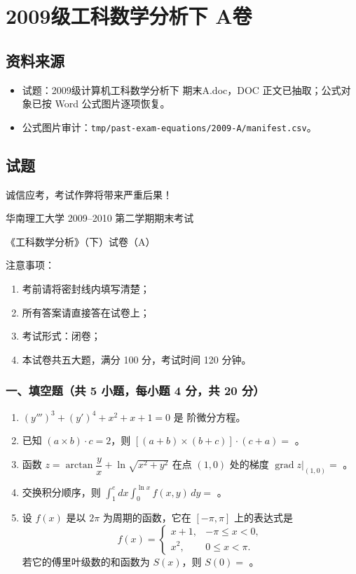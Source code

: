 \section{2009级工科数学分析下 A卷}

\subsection{资料来源}
\begin{itemize}
  \item 试题：2009级计算机工科数学分析下 期末A.doc，DOC 正文已抽取；公式对象已按 Word 公式图片逐项恢复。
  \item 公式图片审计：\texttt{tmp/past-exam-equations/2009-A/manifest.csv}。
\end{itemize}

\subsection{试题}
诚信应考，考试作弊将带来严重后果！

华南理工大学 2009--2010 第二学期期末考试

《工科数学分析》（下）试卷（A）

注意事项：
\begin{enumerate}
  \item 考前请将密封线内填写清楚；
  \item 所有答案请直接答在试卷上；
  \item 考试形式：闭卷；
  \item 本试卷共五大题，满分 100 分，考试时间 120 分钟。
\end{enumerate}

\subsubsection*{一、填空题（共 5 小题，每小题 4 分，共 20 分）}
\begin{enumerate}
  \item $(y''')^3+(y')^4+x^2+x+1=0$ 是 \underline{\hspace{2cm}} 阶微分方程。
  \item 已知 $(a\times b)\cdot c=2$，则 $[(a+b)\times(b+c)]\cdot(c+a)=$ \underline{\hspace{3cm}}。
  \item 函数 $z=\arctan\dfrac{y}{x}+\ln\sqrt{x^2+y^2}$ 在点 $(1,0)$ 处的梯度 $\operatorname{grad}z\big|_{(1,0)}=$ \underline{\hspace{3cm}}。
  \item 交换积分顺序，则 $\displaystyle\int_1^e dx\int_0^{\ln x}f(x,y)\,dy=$ \underline{\hspace{3cm}}。
  \item 设 $f(x)$ 是以 $2\pi$ 为周期的函数，它在 $[-\pi,\pi]$ 上的表达式是
  \[
  f(x)=
  \begin{cases}
  x+1,&-\pi\le x<0,\\
  x^2,&0\le x<\pi.
  \end{cases}
  \]
  若它的傅里叶级数的和函数为 $S(x)$，则 $S(0)=$ \underline{\hspace{3cm}}。
\end{enumerate}

